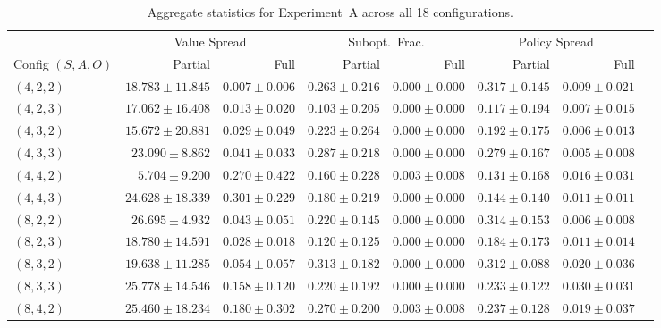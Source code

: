 \documentclass{article}
\theoremstyle{definition}
\theoremstyle{remark}
\begin{document}
\begin{table}[h]
  \caption{Aggregate statistics for Experiment~A across all 18 configurations.}
  \centering
  \small
  \renewcommand{\arraystretch}{1.15}
  \begin{tabular}{@{}lrrrrrrr@{}}
    \toprule
    & \multicolumn{2}{c}{Value Spread}
      & \multicolumn{2}{c}{Subopt.\ Frac.}
      & \multicolumn{2}{c}{Policy Spread} \\
    \cmidrule(lr){2-3}
    \cmidrule(lr){4-5}
    \cmidrule(lr){6-7}
    Config $(S,A,O)$ & Partial & Full & Partial & Full & Partial & Full \\
    \midrule
    $(4,2,2)$  & $18.783 \pm 11.845$ & $0.007 \pm 0.006$ & $0.263 \pm 0.216$ & $0.000 \pm 0.000$ & $0.317 \pm 0.145$ & $0.009 \pm 0.021$ \\
    $(4,2,3)$  & $17.062 \pm 16.408$ & $0.013 \pm 0.020$ & $0.103 \pm 0.205$ & $0.000 \pm 0.000$ & $0.117 \pm 0.194$ & $0.007 \pm 0.015$ \\
    $(4,3,2)$  & $15.672 \pm 20.881$ & $0.029 \pm 0.049$ & $0.223 \pm 0.264$ & $0.000 \pm 0.000$ & $0.192 \pm 0.175$ & $0.006 \pm 0.013$ \\
    $(4,3,3)$  & $23.090 \pm 8.862$  & $0.041 \pm 0.033$ & $0.287 \pm 0.218$ & $0.000 \pm 0.000$ & $0.279 \pm 0.167$ & $0.005 \pm 0.008$ \\
    $(4,4,2)$  & $5.704 \pm 9.200$   & $0.270 \pm 0.422$ & $0.160 \pm 0.228$ & $0.003 \pm 0.008$ & $0.131 \pm 0.168$ & $0.016 \pm 0.031$ \\
    $(4,4,3)$  & $24.628 \pm 18.339$ & $0.301 \pm 0.229$ & $0.180 \pm 0.219$ & $0.000 \pm 0.000$ & $0.144 \pm 0.140$ & $0.011 \pm 0.011$ \\
    $(8,2,2)$  & $26.695 \pm 4.932$  & $0.043 \pm 0.051$ & $0.220 \pm 0.145$ & $0.000 \pm 0.000$ & $0.314 \pm 0.153$ & $0.006 \pm 0.008$ \\
    $(8,2,3)$  & $18.780 \pm 14.591$ & $0.028 \pm 0.018$ & $0.120 \pm 0.125$ & $0.000 \pm 0.000$ & $0.184 \pm 0.173$ & $0.011 \pm 0.014$ \\
    $(8,3,2)$  & $19.638 \pm 11.285$ & $0.054 \pm 0.057$ & $0.313 \pm 0.182$ & $0.000 \pm 0.000$ & $0.312 \pm 0.088$ & $0.020 \pm 0.036$ \\
    $(8,3,3)$  & $25.778 \pm 14.546$ & $0.158 \pm 0.120$ & $0.220 \pm 0.192$ & $0.000 \pm 0.000$ & $0.233 \pm 0.122$ & $0.030 \pm 0.031$ \\
    $(8,4,2)$  & $25.460 \pm 18.234$ & $0.180 \pm 0.302$ & $0.270 \pm 0.200$ & $0.003 \pm 0.008$ & $0.237 \pm 0.128$ & $0.019 \pm 0.037$ \\

\end{tabular}
\end{table}
\end{document}
